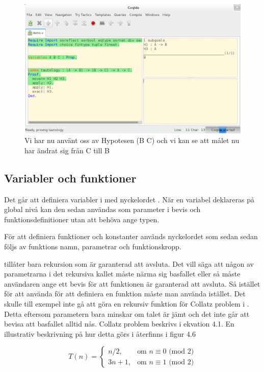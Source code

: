 \begin{figure}[H]
  \centering
  \includegraphics[width=150mm]{images/Proof_part3}
  \caption[Bevis i \coq Ide]
   {Vi har nu använt oss av Hypotesen (B \rightarrow C) och vi
    kan se att målet nu har ändrat sig från C till B}
\end{figure}


\subsection{Variabler och funktioner}

Det går att definiera variabler i \coq med nyckelordet . När en
variabel deklareras på global nivå kan den sedan användas som parameter i bevis
och funktionsdefinitioner utan att behöva ange typen.

För att definiera funktioner och konstanter används nyckelordet
 som sedan sedan följs av funktions namn, parametrar och
funktionskropp.

\coq tillåter bara rekursion som är garanterad att avsluta. Det vill säga att
någon av parametrarna i det rekursiva kallet måste närma sig basfallet eller så
måste användaren ange ett bevis för att funktionen är garanterad att avsluta.
Så istället för att använda  för att definiera en funktion måste
man använda  istället. Det skulle till exempel inte gå att göra en
rekursiv funktion för Collatz problem i \coq.
Detta eftersom parametern bara
minskar om talet är jämt och det inte går att bevisa att basfallet alltid nås.
Collatz problem beskrivs i ekvation 4.1. En illustrativ beskrivning på hur detta
görs i återfinns i figur 4.6

\begin{equation}
T(n) = \left\{\begin{matrix} n/2, & \mbox{om }n\equiv0\mbox{ (mod 2)} \\ 3n+1,
                         & \mbox{om }n\equiv1\mbox{ (mod 2)} \end{matrix}\right.
\end{equation}






